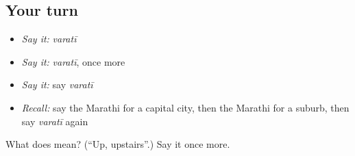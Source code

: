 \subsection*{Your turn}
\begin{itemize}
\raggedright
  \item \emph{Say it:} \emph{varatī}
  \item \emph{Say it:} \emph{varatī}, once more
  \item \emph{Say it:} say \emph{varatī}
  \item \emph{Recall:} say the Marathi for a capital city, then the Marathi for a suburb, then say \emph{varatī} again
\end{itemize}

\begin{tcolorbox}[breakable,colback=teal!4,colframe=teal!35!black,title={Before you move on}]
What does  mean? (\textquotedblleft{}Up, upstairs\textquotedblright{}.) Say it once more.
\end{tcolorbox}
